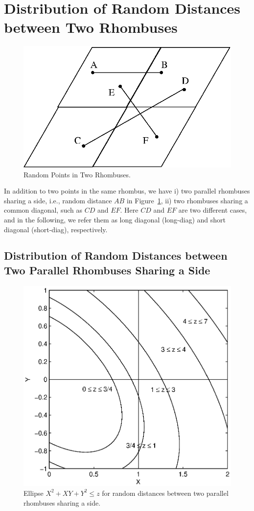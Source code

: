 \documentclass[12pt,draftclsnofoot,onecolumn]{IEEEtran}
\begin{document}
\section{Distribution of Random Distances between Two Rhombuses}

\begin{figure}
  \centering
  \includegraphics[width=0.4\columnwidth]{fig/rhombus}
  \caption{Random Points in Two Rhombuses.}
  \label{fig:two}
\end{figure}

In addition to two points in the same rhombus, we have i) two parallel rhombuses
sharing a side, i.e., random distance $AB$ in Figure~\ref{fig:two}, ii) two
rhombuses sharing a common diagonal, such as $CD$ and $EF$. Here $CD$ and $EF$
are two different cases, and in the following, we refer them as long diagonal
(long-diag) and short diagonal (short-diag), respectively.

\subsection{Distribution of Random Distances between Two Parallel Rhombuses Sharing a
Side}

\begin{figure}
  \centering
  \includegraphics[width=0.5\columnwidth]{fig/rhombus_para}
  \caption{Ellipse $X^2+XY+Y^2 \leq z$ for random distances between two parallel rhombuses sharing a side.}
  \label{fig:para}
\end{figure}
\end{document}
